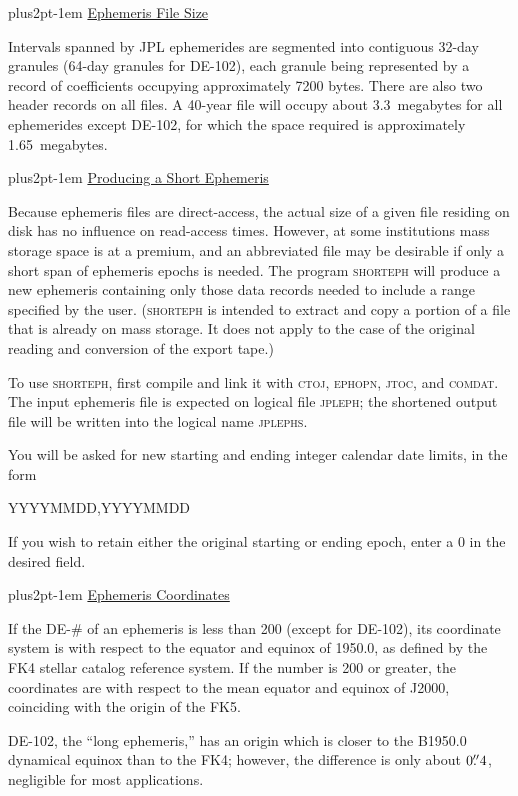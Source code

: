 \documentclass[twoside,11pt,nolof]{starlink}
\providecommand{\hdg}[1]{\vskip4pt plus2pt\leavevmode\kern-1em \underline{\large{#1}}\par}
\begin{document}
\hdg{Ephemeris File Size}

Intervals spanned by JPL ephemerides are segmented into contiguous
32-day granules (64-day granules for DE-102),
each granule being represented by a
record of coefficients occupying approximately 7200 bytes.
There are also two
header records on all files. A 40-year file will occupy about
3.3~megabytes for all ephemerides except DE-102, for which the
space required is approximately 1.65~megabytes.

\hdg{Producing a Short Ephemeris}

Because ephemeris files are direct-access, the actual size of a given
file residing on disk has no influence on read-access times.
However, at some institutions mass storage space is at a premium, and
an abbreviated file may be desirable if only a short span of ephemeris
epochs is needed. The program \textsc{shorteph} will produce a new
ephemeris containing only those data records needed to include
a range specified by the user. (\textsc{shorteph} is intended to
extract and copy a portion of a file that is already on mass storage.
It does not apply to the case of the original reading and
conversion of the export tape.)

To use \textsc{shorteph}, first compile and link it with \textsc{ctoj,
 ephopn, jtoc}, and \textsc{comdat}. The input ephemeris
file is expected on logical file \textsc{jpleph}; the shortened output file
will be written into the logical name \textsc{jplephs}.

You will be asked for new starting and ending integer
calendar date limits, in the form
\begin{terminalv}
        YYYYMMDD,YYYYMMDD
\end{terminalv}
If you wish to retain either the original starting or ending epoch,
enter a 0 in the desired field.

\hdg{Ephemeris Coordinates}

If the DE-\# of an ephemeris is less than 200 (except for DE-102),
its coordinate
system is with respect to the equator and equinox of 1950.0, as
defined by the FK4 stellar catalog reference system. If the number
is 200 or greater, the coordinates are with respect to the mean
equator and equinox of J2000, coinciding with the origin of the FK5.

DE-102, the ``long ephemeris,'' has an origin which is closer
to the B1950.0 dynamical equinox than to the FK4; however, the
difference is only about $0.\kern-3pt''4$, negligible for
most applications.
\end{document}
